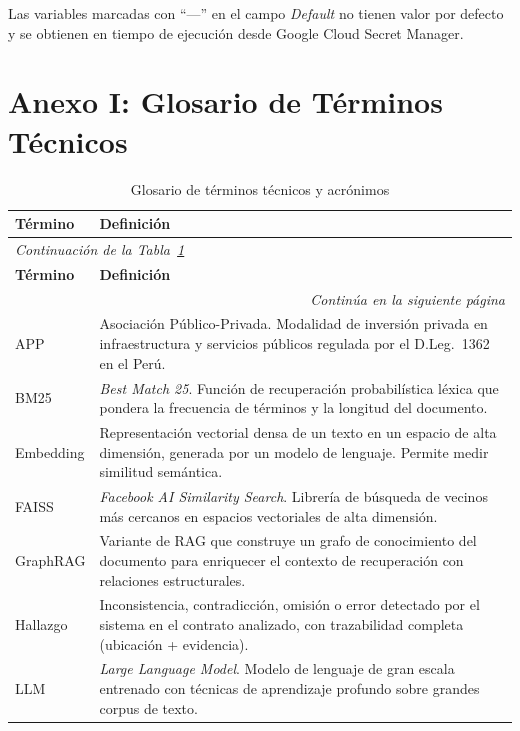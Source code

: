 \noindent Las variables marcadas con ``—'' en el campo \textit{Default} no
tienen valor por defecto y se obtienen en tiempo de ejecución desde
Google Cloud Secret Manager.

\section*{Anexo I: Glosario de Términos Técnicos}

\begin{longtable}{p{3.5cm} p{9.5cm}}
\caption{Glosario de términos técnicos y acrónimos}
\label{tab:glosario} \\
\toprule
\textbf{Término} & \textbf{Definición} \\
\midrule
\endfirsthead
\multicolumn{2}{l}{\small\itshape Continuación de la Tabla~\ref{tab:glosario}} \\[4pt]
\toprule
\textbf{Término} & \textbf{Definición} \\
\midrule
\endhead
\midrule
\multicolumn{2}{r}{\small\itshape Continúa en la siguiente página} \\
\endfoot
\bottomrule
\endlastfoot
APP &
    Asociación Público-Privada. Modalidad de inversión privada en infraestructura
    y servicios públicos regulada por el D.Leg.\ 1362 en el Perú. \\[6pt]
BM25 &
    \textit{Best Match 25}. Función de recuperación probabilística léxica
    que pondera la frecuencia de términos y la longitud del documento. \\[6pt]
Embedding &
    Representación vectorial densa de un texto en un espacio de alta dimensión,
    generada por un modelo de lenguaje. Permite medir similitud semántica. \\[6pt]
FAISS &
    \textit{Facebook AI Similarity Search}. Librería de búsqueda de vecinos
    más cercanos en espacios vectoriales de alta dimensión. \\[6pt]
GraphRAG &
    Variante de RAG que construye un grafo de conocimiento del documento
    para enriquecer el contexto de recuperación con relaciones estructurales. \\[6pt]
Hallazgo &
    Inconsistencia, contradicción, omisión o error detectado por el sistema
    en el contrato analizado, con trazabilidad completa (ubicación + evidencia). \\[6pt]
LLM &
    \textit{Large Language Model}. Modelo de lenguaje de gran escala entrenado
    con técnicas de aprendizaje profundo sobre grandes corpus de texto. \\[6pt]

\end{longtable}
